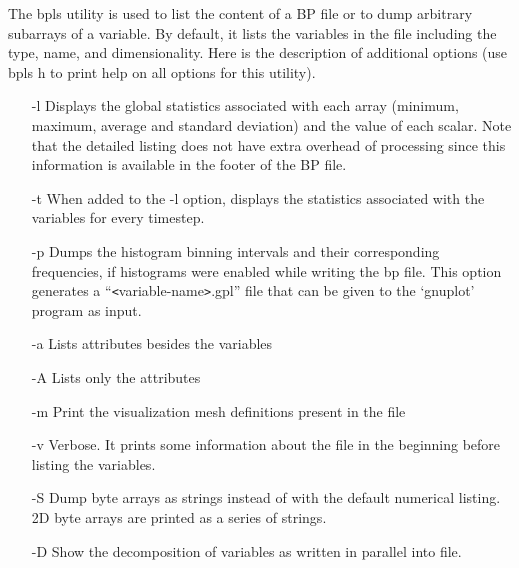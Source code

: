 The bpls utility is used to list the content of a BP file or to dump arbitrary 
subarrays of a variable. By default, it lists the variables in the file including 
the type, name, and dimensionality. Here is the description of additional options 
(use bpls \-{}h to print help on all options for this utility).

\begin{itemize}
\item[-l]  Displays the global statistics associated with each array (minimum, maximum, 
average and standard deviation) and the value of each scalar. Note that the detailed 
listing does not have extra overhead of processing since this information is available 
in the footer of the BP file. 

\item[-t]  When added to the -l option, displays the statistics associated with the variables 
for every timestep. 

\item[-p] Dumps the histogram binning intervals and their corresponding frequencies, if 
histograms were enabled while writing the bp file. This option generates a ``\texttt{<}variable-name\texttt{>}.gpl'' 
file that can be given to the `gnuplot' program as input. 

\item[-a] Lists attributes besides the variables

\item[-A] Lists only the attributes

\item[-m] Print the visualization mesh definitions present in the file

%
%

\item[-v] Verbose. It prints some information about the file in the beginning before listing 
the variables. 

\item[-S] Dump byte arrays as strings instead of with the default numerical listing. 2D 
byte arrays are printed as a series of strings. 

\item[-D] Show the decomposition of variables as written in parallel into file. 
\end{itemize}

